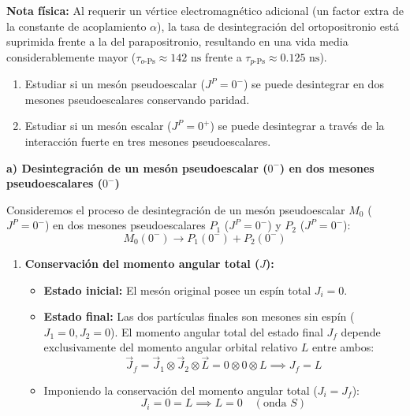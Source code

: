 \begin{problema}
\textbf{Nota física:} Al requerir un vértice electromagnético adicional (un factor extra de la constante de acoplamiento $\alpha$), la tasa de desintegración del ortopositronio está suprimida frente a la del parapositronio, resultando en una vida media considerablemente mayor ($\tau_{o\text{-Ps}} \approx 142 \text{ ns}$ frente a $\tau_{p\text{-Ps}} \approx 0.125 \text{ ns}$).
\end{problema}


\newpage
\begin{problema}
\begin{enumerate}[label=\alph*)]
    \item Estudiar si un mesón pseudoescalar ($J^P=0^-$) se puede desintegrar en dos mesones pseudoescalares conservando paridad.
    \item Estudiar si un mesón escalar ($J^P=0^+$) se puede desintegrar a través de la interacción fuerte en tres mesones pseudoescalares.
\end{enumerate}
\tcblower
\textbf{a) Desintegración de un mesón pseudoescalar ($0^-$) en dos mesones pseudoescalares ($0^-$)}

Consideremos el proceso de desintegración de un mesón pseudoescalar $M_0$ ($J^P = 0^-$) en dos mesones pseudoescalares $P_1$ ($J^P = 0^-$) y $P_2$ ($J^P = 0^-$):
\begin{equation*}
    M_0 (0^-) \longrightarrow P_1 (0^-) + P_2 (0^-)
\end{equation*}

\begin{enumerate}[label=\arabic*.]
    \item \textbf{Conservación del momento angular total ($J$):}
    \begin{itemize}
        \item \textbf{Estado inicial:} El mesón original posee un espín total $J_i = 0$.
        \item \textbf{Estado final:} Las dos partículas finales son mesones sin espín ($J_1 = 0, J_2 = 0$). El momento angular total del estado final $J_f$ depende exclusivamente del momento angular orbital relativo $L$ entre ambos:
        \begin{equation*}
            \vec{J}_f = \vec{J}_1 \otimes \vec{J}_2 \otimes \vec{L} = 0 \otimes 0 \otimes L \implies J_f = L
        \end{equation*}
        \item Imponiendo la conservación del momento angular total ($J_i = J_f$):
        \begin{equation*}
            J_i = 0 = L \implies L = 0 \quad (\text{onda } S)
        \end{equation*}
    \end{itemize}


\end{enumerate}
\end{problema}
